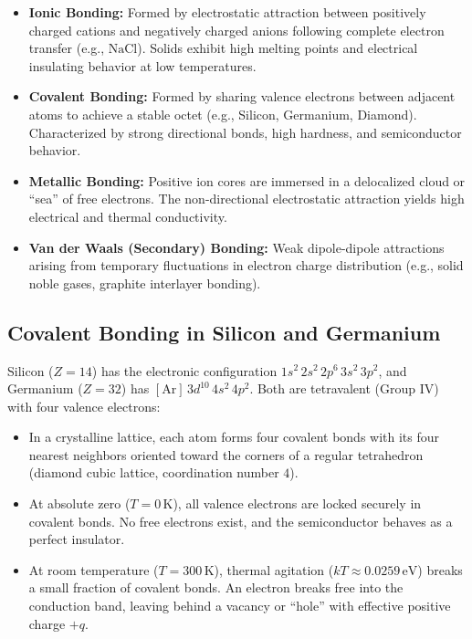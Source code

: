 \documentclass[12pt,a4paper]{article}
\begin{document}
\begin{itemize}[leftmargin=*, itemsep=3pt]
  \item \textbf{Ionic Bonding:} Formed by electrostatic attraction between positively charged cations and negatively charged anions following complete electron transfer (e.g., $\text{NaCl}$). Solids exhibit high melting points and electrical insulating behavior at low temperatures.
  \item \textbf{Covalent Bonding:} Formed by sharing valence electrons between adjacent atoms to achieve a stable octet (e.g., Silicon, Germanium, Diamond). Characterized by strong directional bonds, high hardness, and semiconductor behavior.
  \item \textbf{Metallic Bonding:} Positive ion cores are immersed in a delocalized cloud or ``sea'' of free electrons. The non-directional electrostatic attraction yields high electrical and thermal conductivity.
  \item \textbf{Van der Waals (Secondary) Bonding:} Weak dipole-dipole attractions arising from temporary fluctuations in electron charge distribution (e.g., solid noble gases, graphite interlayer bonding).
\end{itemize}

\subsection{Covalent Bonding in Silicon and Germanium}
Silicon ($Z=14$) has the electronic configuration $1s^2\,2s^2\,2p^6\,3s^2\,3p^2$, and Germanium ($Z=32$) has $[\text{Ar}]\,3d^{10}\,4s^2\,4p^2$. Both are tetravalent (Group IV) with four valence electrons:

\begin{itemize}[leftmargin=*, itemsep=3pt]
  \item In a crystalline lattice, each atom forms four covalent bonds with its four nearest neighbors oriented toward the corners of a regular tetrahedron (diamond cubic lattice, coordination number $4$).
  \item At absolute zero ($T = 0\,\text{K}$), all valence electrons are locked securely in covalent bonds. No free electrons exist, and the semiconductor behaves as a perfect insulator.
  \item At room temperature ($T = 300\,\text{K}$), thermal agitation ($k T \approx 0.0259\,\text{eV}$) breaks a small fraction of covalent bonds. An electron breaks free into the conduction band, leaving behind a vacancy or ``hole'' with effective positive charge $+q$.
\end{itemize}
\end{document}
